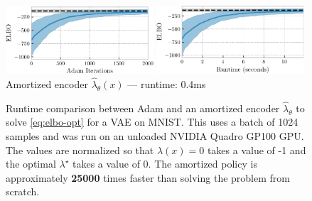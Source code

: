 \begin{figure}[t]
  \centering
  \vspace{-4mm}
  \includegraphics[width=0.49\textwidth]{fig/vae-iter.pdf}
  \hfill
  \includegraphics[width=0.49\textwidth]{fig/vae-time.pdf} \\
   Amortized encoder $\hat\lambda_\theta(x)$ --- runtime: 0.4ms
  \caption{
    Runtime comparison between Adam and an amortized encoder $\hat\lambda_\theta$
    to solve \cref{eq:elbo-opt} for a VAE on MNIST.
    This uses a batch of 1024 samples and was
    run on an unloaded NVIDIA Quadro GP100 GPU.
    The values are normalized so that $\lambda(x)=0$ takes a value of -1 and
    the optimal $\lambda^\star$ takes a value of 0.
    The amortized policy is approximately
    \textbf{25000} times faster than solving the
    problem from scratch.
  }
  \label{fig:vae-performance}
\end{figure}

